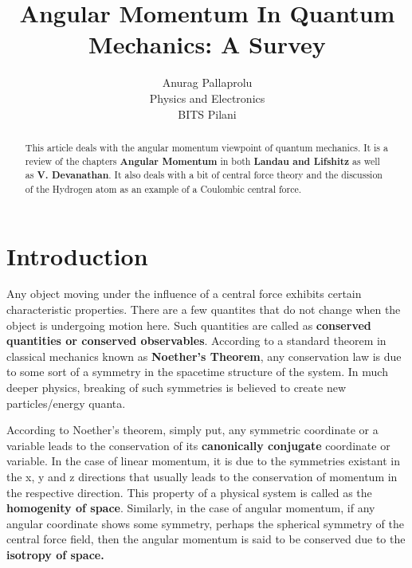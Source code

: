 \documentclass[12pt]{article}
\begin{document}
\title{Angular Momentum In Quantum Mechanics: A Survey}
\author{Anurag Pallaprolu \\Physics and Electronics\\ BITS Pilani}
\maketitle
\begin{abstract}
This article deals with the angular momentum viewpoint of quantum mechanics. It is a review of the chapters \textbf{Angular Momentum} in both \textbf{Landau and Lifshitz} as well as \textbf{V. Devanathan}. It also deals with a bit of central force theory and the discussion of the Hydrogen atom as an example of a Coulombic central force.
\end{abstract}
\section*{Introduction}
Any object moving under the influence of a central force exhibits certain characteristic properties. There are a few quantites that do not change when the object is undergoing motion here. Such quantities are called as \textbf{conserved quantities or conserved observables}. According to a standard theorem in classical mechanics known as \textbf{Noether's Theorem}, any conservation law is due to some sort of a symmetry in the spacetime structure of the system. In much deeper physics, breaking of such symmetries is believed to create new particles/energy quanta. 

According to Noether's theorem, simply put, any symmetric coordinate or a variable leads to the conservation of its \textbf{canonically conjugate} coordinate or variable. In the case of linear momentum, it is due to the symmetries existant in the x, y and z directions that usually leads to the conservation of momentum in the respective direction. This property of a physical system is called as the \textbf{homogenity of space}. Similarly, in the case of angular momentum, if any angular coordinate shows some symmetry, perhaps the spherical symmetry of the central force field, then the angular momentum is said to be conserved due to the \textbf{isotropy of space.}
\end{document}
